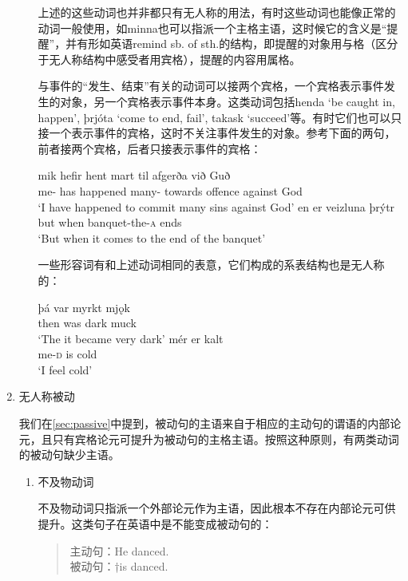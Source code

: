 \begin{enumerate}
\begin{enumerate}
上述的这些动词也并非都只有无人称的用法，有时这些动词也能像正常的动词一般使用，如minna也可以指派一个主格主语，这时候它的含义是“提醒”，并有形如英语remind sb. of sth.的结构，即提醒的对象用与格（区分于无人称结构中感受者用宾格），提醒的内容用属格。

与事件的“发生、结束”有关的动词可以接两个宾格，一个宾格表示事件发生的对象，另一个宾格表示事件本身。这类动词包括henda `be caught in, happen’, þrjóta `come to end, fail’, takask `succeed’等。有时它们也可以只接一个表示事件的宾格，这时不关注事件发生的对象。参考下面的两句，前者接两个宾格，后者只接表示事件的宾格：
\begin{exe}
    \ex \gll 
    mik	hefir	hent	mart	til	afgerða	við	Guð\\
me-{{\acc}}	has	happened	many-{\acc} towards	offence	against	God\\
\trans `I have happened to commit many sins against God’
\ex \gll
en	er	veizluna	þrýtr\\
but	when	banquet-the-\textsc{a}	ends\\
\trans `But when it comes to the end of the banquet’
\end{exe}

一些形容词有和上述动词相同的表意，它们构成的系表结构也是无人称的：
\begin{exe}
    \ex \gll
    þá	var	myrkt	mjǫk\\
then	was	dark	muck\\
\trans `The it became very dark’
\ex \gll
mér	er	kalt\\
me-\textsc{d}	is	cold\\
\trans `I feel cold’
\end{exe}
    \end{enumerate}

    \item 无人称被动

我们在\ref{sec:passive}中提到，被动句的主语来自于相应的主动句的谓语的内部论元，且只有宾格论元可提升为被动句的主格主语。按照这种原则，有两类动词的被动句缺少主语。
\begin{enumerate}
\setlength{\parindent}{2em}
    \item 不及物动词

    不及物动词只指派一个外部论元作为主语，因此根本不存在内部论元可供提升。这类句子在英语中是不能变成被动句的：
    \begin{quote}
        主动句：He danced.\\
被动句：†is danced.
    \end{quote}
    

\end{enumerate}
\end{enumerate}
